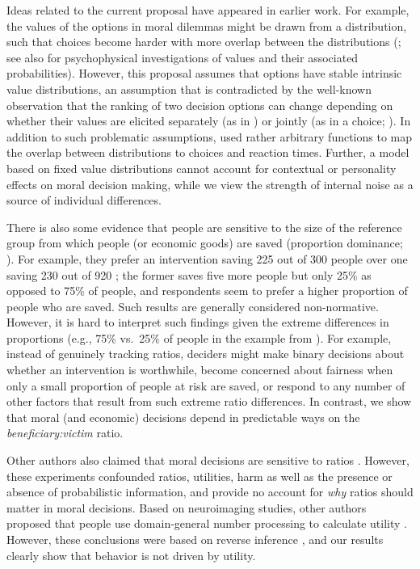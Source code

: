\documentclass[
]{article}
\begin{document}
Ideas related to the current proposal have appeared in earlier work. For example, the values of the options in moral dilemmas might be drawn from a distribution, such that choices become harder with more overlap between the distributions (\autocite{Cohen2016}; see also \autocite{Gonzalez1999} for psychophysical investigations of values and their associated probabilities). However, this proposal assumes that options have stable intrinsic value distributions, an assumption that is contradicted by the well-known observation that the ranking of two decision options can change depending on whether their values are elicited separately (as in \autocite{Cohen2016}) or jointly (as in a choice; \autocite{Hsee1998}). In addition to such problematic assumptions, \autocite{Cohen2016} used rather arbitrary functions to map the overlap between distributions to choices and reaction times. Further, a model based on fixed value distributions cannot account for contextual or personality effects on moral decision making, while we view the strength of internal noise as a source of individual differences.

There is also some evidence that people are sensitive to the size of the reference group from which people (or economic goods) are saved (proportion dominance; \autocite{Bartels2006}). For example, they prefer an intervention saving 225 out of 300 people over one saving 230 out of 920 \autocite{Bartels2006,Fetherstonhaugh1997,Baron1997,Jenni1997,Slovic2013}; the former saves five more people but only 25\% as opposed to 75\% of people, and respondents seem to prefer a higher proportion of people who are saved. Such results are generally considered non-normative. However, it is hard to interpret such findings given the extreme differences in proportions (e.g., 75\% vs.~25\% of people in the example from \autocite{Bartels2006} ). For example, instead of genuinely tracking ratios, deciders might make binary decisions about whether an intervention is worthwhile, become concerned about fairness when only a small proportion of people at risk are saved, or respond to any number of other factors that result from such extreme ratio differences. In contrast, we show that moral (and economic) decisions depend in predictable ways on the \emph{beneficiary:victim} ratio.

Other authors also claimed that moral decisions are sensitive to ratios \autocite{Ryazanov2023}. However, these experiments confounded ratios, utilities, harm as well as the presence or absence of probabilistic information, and provide no account for \emph{why} ratios should matter in moral decisions. Based on neuroimaging studies, other authors proposed that people use domain-general number processing to calculate utility \autocite{Shenhav2010}. However, these conclusions were based on reverse inference \autocite{Poldrack2006}, and our results clearly show that behavior is not driven by utility.
\end{document}
